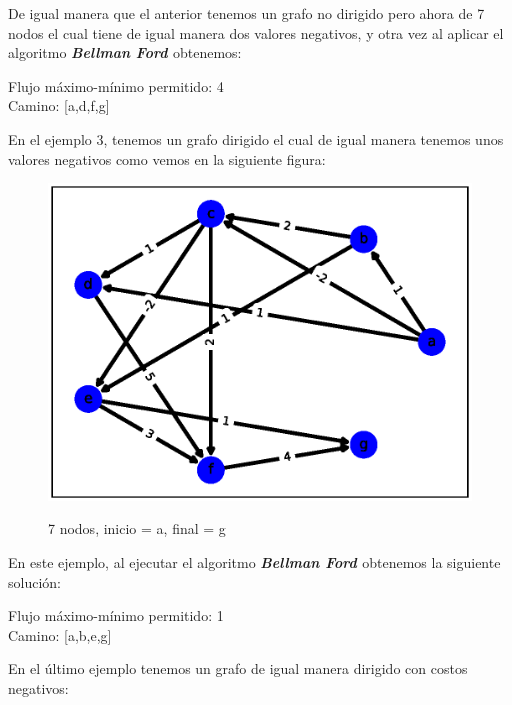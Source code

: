 \documentclass{report}
\newcommand{\bell}{{\bfseries {\textit{Bellman Ford }}}}
\begin{document}
De igual manera que el anterior tenemos un grafo no dirigido pero ahora de 7 nodos el cual tiene de igual manera dos valores negativos, y otra vez al aplicar el algoritmo \bell obtenemos:
\begin{center}
    Flujo máximo-mínimo permitido: 4 \\
    Camino: [a,d,f,g]
\end{center}

En el ejemplo 3, tenemos un grafo dirigido el cual de igual manera tenemos unos valores negativos como vemos en la siguiente figura:


\begin{figure}[h!t]
    \centering
    \includegraphics[scale = 0.5]{ejemplo6.eps}
    \label{figura6}
    \caption{7 nodos, inicio = a, final = g}
\end{figure}

En este ejemplo, al ejecutar el algoritmo \bell obtenemos la siguiente solución:
\begin{center}
    Flujo máximo-mínimo permitido: 1 \\
    Camino: [a,b,e,g]
\end{center}

En el último ejemplo tenemos un grafo de igual manera dirigido con costos negativos:
\end{document}
